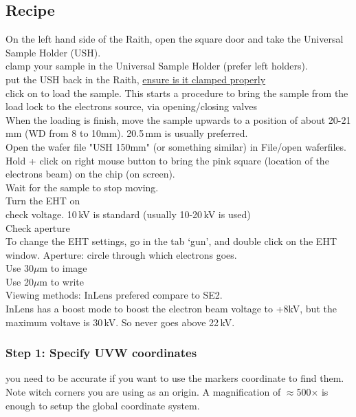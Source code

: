 \subsection{Recipe}

On the left hand side of the Raith, open the square door and take the Universal Sample Holder (USH).\\

clamp your sample in the Universal Sample Holder (prefer left holders).\\

put the USH back in the Raith, \underline{ensure is it clamped properly}\\

click on  to load the sample. This starts a procedure to bring the sample from the load lock to the electrons source, via opening/closing valves\\

When the loading is finish, move the sample upwards to a position of about 20-21 mm (WD from 8 to 10mm). 20.5\,mm is usually preferred.\\

Open the wafer file "USH 150mm" (or something similar) in File/open waferfiles.\\

Hold  + click on right mouse button to bring the pink square (location of the electrons beam) on the chip (on screen).\\
Wait for the sample to stop moving.\\

Turn the EHT on \\

check voltage. 10\,kV is standard (usually 10-20\,kV is used)\\

Check aperture \\
To change the EHT settings, go in the tab `gun', and double click on the EHT window. Aperture: circle through which electrons goes.\\
Use 30$\mu$m to image\\
Use 20$\mu$m to write\\

Viewing methods: InLens prefered compare to SE2.\\
InLens has a boost mode to boost the electron beam voltage to +8kV, but the maximum voltave is 30\,kV. So never goes above 22\,kV. \\

\subsubsection{Step 1: Specify UVW coordinates}
you need to be accurate if you want to use the markers coordinate to find them. Note witch corners you are using as an origin. A magnification of $\approx$500$\times$  is enough to setup the global coordinate system.\\

